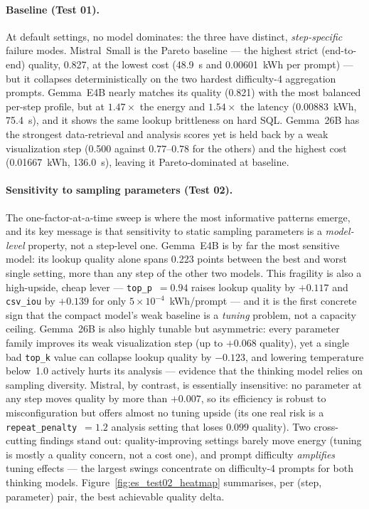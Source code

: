 \documentclass[11pt,a4paper,twocolumn]{article}
\begin{document}
\paragraph{Baseline (Test 01).}
At default settings, no model dominates: the three have distinct, \emph{step-specific}
failure modes. Mistral~Small is the Pareto baseline --- the highest strict (end-to-end)
quality, 0.827, at the lowest cost (48.9~s and 0.00601~kWh per prompt) --- but it collapses
deterministically on the two hardest difficulty-4 aggregation prompts. Gemma~E4B nearly
matches its quality (0.821) with the most balanced per-step profile, but at $1.47\times$ the
energy and $1.54\times$ the latency (0.00883~kWh, 75.4~s), and it shows the same lookup
brittleness on hard SQL. Gemma~26B has the strongest data-retrieval and analysis scores yet
is held back by a weak visualization step (0.500 against $0.77$--$0.78$ for the others) and
the highest cost (0.01667~kWh, 136.0~s), leaving it Pareto-dominated at baseline.

\paragraph{Sensitivity to sampling parameters (Test 02).}
The one-factor-at-a-time sweep is where the most informative patterns emerge, and its key
message is that sensitivity to static sampling parameters is a \emph{model-level} property,
not a step-level one. Gemma~E4B is by far the most sensitive model: its lookup quality alone
spans 0.223 points between the best and worst single setting, more than any step of the other
two models. This fragility is also a high-upside, cheap lever --- \texttt{top\_p}~$=0.94$
raises lookup quality by $+0.117$ and \texttt{csv\_iou} by $+0.139$ for only
$5\times10^{-4}$~kWh/prompt --- and it is the first concrete sign that the compact model's
weak baseline is a \emph{tuning} problem, not a capacity ceiling. Gemma~26B is also highly
tunable but asymmetric: every parameter family improves its weak visualization step (up to
$+0.068$ quality), yet a single bad \texttt{top\_k} value can collapse lookup quality by
$-0.123$, and lowering temperature below~1.0 actively hurts its analysis --- evidence that the
thinking model relies on sampling diversity. Mistral, by contrast, is essentially insensitive:
no parameter at any step moves quality by more than $+0.007$, so its efficiency is robust to
misconfiguration but offers almost no tuning upside (its one real risk is a
\texttt{repeat\_penalty}~$=1.2$ analysis setting that loses $0.099$ quality). Two
cross-cutting findings stand out: quality-improving settings barely
move energy (tuning is mostly a quality concern, not a cost one), and prompt difficulty
\emph{amplifies} tuning effects --- the largest swings concentrate on difficulty-4 prompts for
both thinking models. Figure~\ref{fig:es_test02_heatmap} summarises, per (step, parameter)
pair, the best achievable quality delta.
\end{document}
